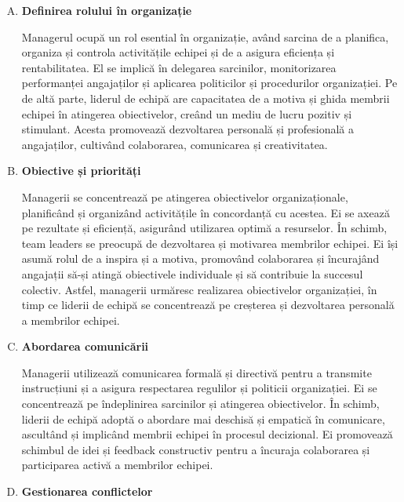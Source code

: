 \documentclass[a4paper, 12pt]{article}
\begin{document}
	\begin{enumerate}[A)]

		\item\textbf{Definirea rolului în organizație}
		
		\quad Managerul ocupă un rol esential în organizație, având sarcina de a planifica, organiza și controla activitățile echipei și de a asigura eficiența și rentabilitatea. El se implică în delegarea sarcinilor, monitorizarea performanței angajaților și aplicarea politicilor și procedurilor organizației. Pe de altă parte, liderul de echipă are capacitatea de a motiva și ghida membrii echipei în atingerea obiectivelor, creând un mediu de lucru pozitiv și stimulant. Acesta promovează dezvoltarea personală și profesională a angajaților, cultivând colaborarea, comunicarea și creativitatea.

		\item \textbf{Obiective și priorități}

		\quad\quad Managerii se concentrează pe atingerea obiectivelor organizaționale, planificând și organizând activitățile în concordanță cu acestea. Ei se axează pe rezultate și eficiență, asigurând utilizarea optimă a resurselor. În schimb, team leaders se preocupă de dezvoltarea și motivarea membrilor echipei. Ei își asumă rolul de a inspira și a motiva, promovând colaborarea și încurajând angajații să-și atingă obiectivele individuale și să contribuie la succesul colectiv. Astfel, managerii urmăresc realizarea obiectivelor organizației, în timp ce liderii de echipă se concentrează pe creșterea și dezvoltarea personală a membrilor echipei.

		\item \textbf{Abordarea comunicării}
		
		\quad\quad Managerii utilizează comunicarea formală și directivă pentru a transmite instrucțiuni și a asigura respectarea regulilor și politicii organizației. Ei se concentrează pe îndeplinirea sarcinilor și atingerea obiectivelor. În schimb, liderii de echipă adoptă o abordare mai deschisă și empatică în comunicare, ascultând și implicând membrii echipei în procesul decizional. Ei promovează schimbul de idei și feedback constructiv pentru a încuraja colaborarea și participarea activă a membrilor echipei.

		\item \textbf{Gestionarea conflictelor}


\end{enumerate}
\end{document}
